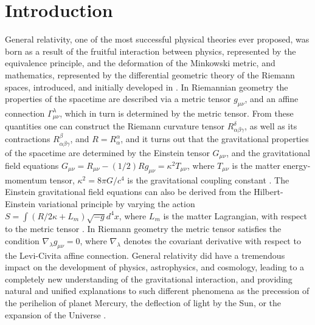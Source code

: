 \documentclass[aps,superscriptaddress, showpacs,preprintnumbers, superscriptaddress, nofootinbibt,twocolumn]{revtex4-2}
\begin{document}
\date{\today }
\maketitle
\tableofcontents


\section{Introduction}

General relativity, one of the most successful physical theories ever proposed, was born as a result of the fruitful interaction between physics, represented by the equivalence principle, and the deformation of the Minkowski metric, and mathematics, represented by the differential geometric theory of the Riemann spaces, introduced, and initially developed in \cite{r1}.  In Riemannian geometry the properties of the spacetime are described via a metric tensor $g_{\mu \nu}$, and an affine connection $\Gamma _{\mu \nu}^{\lambda}$, which in turn is determined by the metric tensor. From these quantities one can construct the Riemann curvature tensor $R_{\alpha \beta \gamma}^{\delta}$, as well as its contractions $R_{\alpha \beta \gamma}^{\beta}$, and $R=R_{\alpha }^{\alpha}$, and it turns out that the gravitational properties of the spacetime are determined by the Einstein tensor $G_{\mu \nu}$, and the gravitational field equations $G_{\mu \nu}=R_{\mu \nu}-(1/2)Rg_{\mu \nu}=\kappa ^2 T_{\mu \nu}$, where $T_{\mu \nu}$ is the matter energy-momentum tensor, $\kappa ^2 =8\pi G/c^4$ is the gravitational coupling constant \cite{r2,r3,r4}. The Einstein gravitational field equations can also be derived from the Hilbert-Einstein variational principle by varying the action $S=\int{\left(R/2\kappa +L_m\right)\sqrt{-g}d^4x}$, where $L_m$ is the matter Lagrangian, with respect to the metric tensor \cite{r3}. In Riemann geometry the metric tensor satisfies the condition $\nabla _\lambda g_{\mu \nu}=0$, where $\nabla _{\lambda}$ denotes the covariant derivative with respect to the Levi-Civita affine connection. General relativity did have a tremendous impact on the development of physics, astrophysics, and cosmology, leading to a completely new understanding of the gravitational interaction, and providing  natural and unified explanations to such different phenomena as the precession of the perihelion of planet Mercury, the deflection of light by the Sun, or the expansion of the Universe \cite{Gron}.
\end{document}
